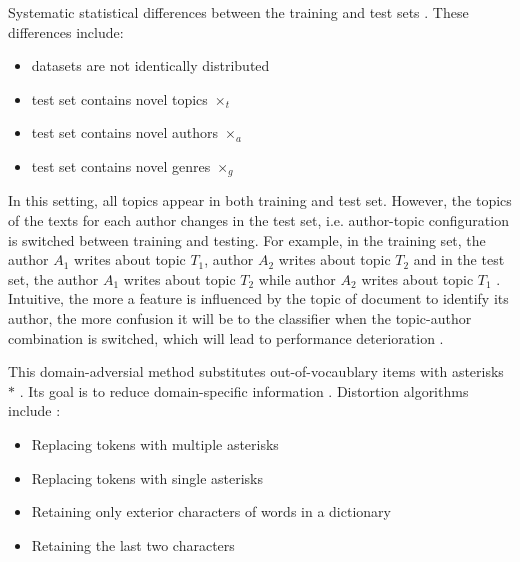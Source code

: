 \begin{definition}
    Systematic statistical differences between the training and test sets \cite{tyo_state_2022}.
    These differences include:
    \begin{itemize}
        \item datasets are not identically distributed
        \item test set contains novel topics $\times_t$
        \item test set contains novel authors $\times_a$
        \item test set contains novel genres $\times_g$
    \end{itemize}
\end{definition}

\begin{definition}
    In this setting, all topics appear in both training and test set. 
    However, the topics of the texts for each author changes in the test set, 
    i.e. author-topic configuration is switched between training and testing.
    For example, in the training set, the author $A_1$ writes about topic $T_1$, author $A_2$ writes about topic $T_2$ 
    and in the test set, 
    the author $A_1$ writes about topic $T_2$ while author $A_2$ writes about topic $T_1$ \cite{tyo_state_2022,altakrori_topic_2021}.
    Intuitive, the more a feature is influenced by the topic of document to identify its author, 
    the more confusion it will be to the classifier when the topic-author combination is switched, which will lead to performance deterioration \cite{altakrori_topic_2021}.
\end{definition}

\begin{definition}
    This domain-adversial method substitutes out-of-vocaublary items with asterisks $*$ \cite{tyo_state_2022}.
    Its goal is to reduce domain-specific information \cite{bischoff_importance_2020}.
    Distortion algorithms include \cite{bischoff_importance_2020}:
    \begin{itemize}
        \item Replacing tokens with multiple asterisks
        \item Replacing tokens with single asterisks
        \item Retaining only exterior characters of words in a dictionary
        \item Retaining the last two characters
    \end{itemize}
\end{definition}

